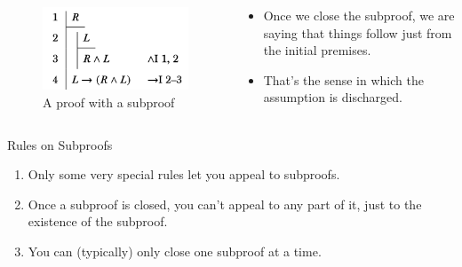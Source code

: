 \documentclass[
  ignorenonframetext,
]{beamer}
\providecommand{\tightlist}{%
  \setlength{\itemsep}{0pt}\setlength{\parskip}{0pt}}
\renewcommand{\,}{\text{, }}
\begin{document}
\begin{frame}
\begin{columns}[c]
\begin{column}{0.48\textwidth}
\begin{figure}
\centering
\includegraphics{4_7c.png}
\caption{A proof with a subproof}
\end{figure}
\end{column}

\begin{column}{0.48\textwidth}
\begin{itemize}
\tightlist
\item
  Once we close the subproof, we are saying that things follow just from
  the initial premises.
\item
  That's the sense in which the assumption is discharged.
\end{itemize}
\end{column}
\end{columns}
\end{frame}

\begin{frame}{Rules on Subproofs}
\protect\hypertarget{rules-on-subproofs}{}
\begin{enumerate}
\tightlist
\item
  Only some very special rules let you appeal to subproofs.
\item
  Once a subproof is closed, you can't appeal to any part of it, just to
  the existence of the subproof.
\item
  You can (typically) only close one subproof at a time.
\end{enumerate}
\end{frame}
\end{document}
